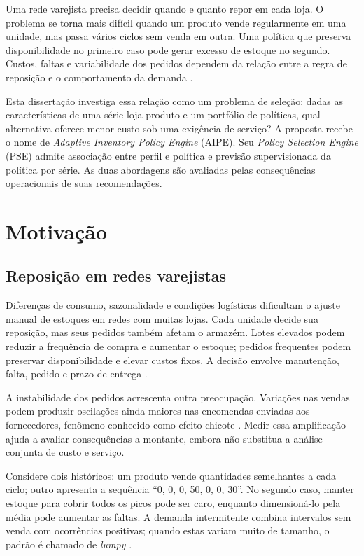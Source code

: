 
Uma rede varejista precisa decidir quando e quanto repor em cada loja. O problema se torna mais difícil quando um produto vende regularmente em uma unidade, mas passa vários ciclos sem venda em outra. Uma política que preserva disponibilidade no primeiro caso pode gerar excesso de estoque no segundo. Custos, faltas e variabilidade dos pedidos dependem da relação entre a regra de reposição e o comportamento da demanda \citep{Axsater2006InventoryControl,Syntetos2005Categorization}.

Esta dissertação investiga essa relação como um problema de seleção: dadas as características de uma série loja-produto e um portfólio de políticas, qual alternativa oferece menor custo sob uma exigência de serviço? A proposta recebe o nome de \textit{Adaptive Inventory Policy Engine} (AIPE). Seu \textit{Policy Selection Engine} (PSE) admite associação entre perfil e política e previsão supervisionada da política por série. As duas abordagens são avaliadas pelas consequências operacionais de suas recomendações.

\section{Motivação}

\subsection{Reposição em redes varejistas}

Diferenças de consumo, sazonalidade e condições logísticas dificultam o ajuste manual de estoques em redes com muitas lojas. Cada unidade decide sua reposição, mas seus pedidos também afetam o armazém. Lotes elevados podem reduzir a frequência de compra e aumentar o estoque; pedidos frequentes podem preservar disponibilidade e elevar custos fixos. A decisão envolve manutenção, falta, pedido e prazo de entrega \citep{Axsater2006InventoryControl,Zipkin2000FoundationsInventory}.

A instabilidade dos pedidos acrescenta outra preocupação. Variações nas vendas podem produzir oscilações ainda maiores nas encomendas enviadas aos fornecedores, fenômeno conhecido como efeito chicote \citep{LeePadmanabhanWhang1997Bullwhip}. Medir essa amplificação ajuda a avaliar consequências a montante, embora não substitua a análise conjunta de custo e serviço.

Considere dois históricos: um produto vende quantidades semelhantes a cada ciclo; outro apresenta a sequência ``0, 0, 0, 50, 0, 0, 30''. No segundo caso, manter estoque para cobrir todos os picos pode ser caro, enquanto dimensioná-lo pela média pode aumentar as faltas. A demanda intermitente combina intervalos sem venda com ocorrências positivas; quando estas variam muito de tamanho, o padrão é chamado de \textit{lumpy} \citep{Croston1972ForecastingIntermittentDemand,Syntetos2005Categorization,Boylan2008Intermittent}.

